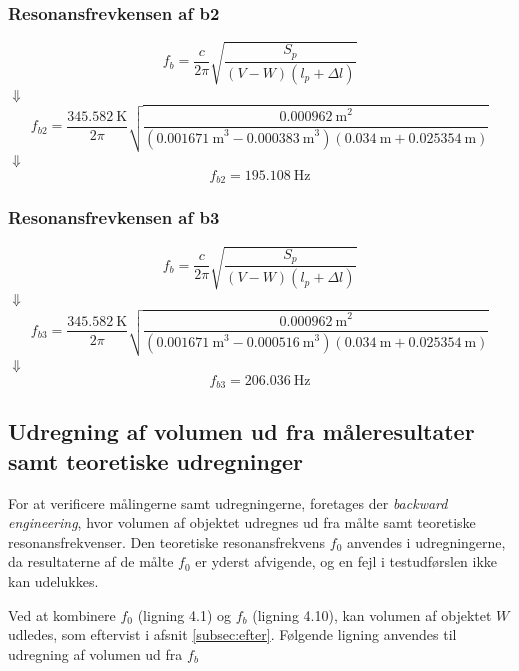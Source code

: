 {\subsubsection{Resonansfrevkensen af b2} 
\hspace{1,5cm}
\begin{equation}
		f_{b} = \frac{c}{2\pi}\sqrt{\frac{S_{p}}{(V-W)(l_{p}+\Delta l)}}
	\end{equation}
$\Downarrow$
\begin{equation}
		f_{b2} = \frac{{\SI{345,582}{\kelvin}}}{2\pi}\sqrt{\frac{{\SI{0,000962}{\meter}^2}}{({\SI{0,001671}{\meter}^3}-{\SI{0,000383}{\meter}^3})({\SI{0,034}{\meter}}+ {\SI{0.025354}{\meter}})}}	
\end{equation}
$\Downarrow$
\begin{equation}
		f_{b2} = {\SI{195,108}{\hertz}}
\end{equation}

\subsubsection{Resonansfrevkensen af b3} 
\hspace{1,5cm}
\begin{equation}
		f_{b} = \frac{c}{2\pi}\sqrt{\frac{S_{p}}{(V-W)(l_{p}+\Delta l)}}
	\end{equation}
$\Downarrow$
\begin{equation}
		f_{b3} = \frac{{\SI{345,582}{\kelvin}}}{2\pi}\sqrt{\frac{{\SI{0,000962}{\meter}^2}}{({\SI{0,001671}{\meter}^3}-{\SI{0,000516}{\meter}^3})({\SI{0,034}{\meter}}+ {\SI{0.025354}{\meter}})}}	
\end{equation}
$\Downarrow$
\begin{equation}
		f_{b3} = {\SI{206,036}{\hertz}}
\end{equation}

\subsection{Udregning af volumen ud fra måleresultater samt teoretiske udregninger}

For at verificere målingerne samt udregningerne, foretages der \textit{backward engineering}, hvor volumen af objektet udregnes ud fra målte samt teoretiske resonansfrekvenser. Den teoretiske resonansfrekvens $f_{0}$ anvendes i udregningerne, da resultaterne af de målte $f_{0}$ er yderst afvigende, og en fejl i testudførslen ikke kan udelukkes.    

Ved at kombinere $f_{0}$ (ligning 4.1) og $f_{b}$ (ligning 4.10), kan volumen af objektet $W$ udledes, som eftervist i afsnit \ref{subsec:efter}. Følgende ligning anvendes til udregning af volumen ud fra $f_{b}$

}
